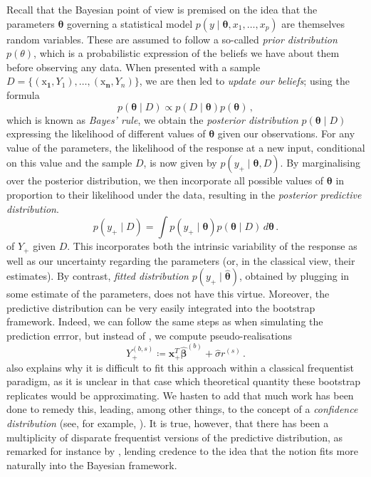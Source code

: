 \documentclass[a4paper]{book}
\begin{document}
Recall that the Bayesian point of view is premised on the idea that the parameters $\bm{\theta}$ governing a statistical model $p(y \mid \bm{\theta}, x_1, \dots, x_p)$ are themselves random variables. These are assumed to follow a so-called \emph{prior distribution} $p(\theta)$, which is a probabilistic expression of the beliefs we have about them before observing any data. When presented with a sample $D = \{ (\bm{\mathrm{x}_1}, Y_1), \dots, (\bm{\mathrm{x}_n}, Y_n) \}$, we are then led to \emph{update our beliefs}; using the formula
\begin{equation}
  p(\bm{\theta} \mid D) \propto p(D \mid \bm{\theta}) p(\bm{\theta}) \,,
\end{equation}
which is known as \emph{Bayes' rule}, we obtain the \emph{posterior distribution} $p(\bm{\theta} \mid D)$ expressing the likelihood of different values of $\bm{\theta}$ given our observations. For any value of the parameters, the likelihood of the response at a new input, conditional on this value and the sample $D$, is now given by $p(y_+ \mid \bm{\theta}, D)$. By marginalising over the posterior distribution, we then incorporate all possible values of $\bm{\theta}$ in proportion to their likelihood under the data, resulting in the \emph{posterior predictive distribution}.
\begin{equation}
  p(y_+ \mid D) = \int p(y_+ \mid \bm{\theta}) p(\bm{\theta} \mid D) \, d \bm{\theta} \,.
\end{equation}
of $Y_+$ given $D$. This incorporates both the intrinsic variability of the response as well as our uncertainty regarding the parameters (or, in the classical view, their estimates). By contrast, \emph{fitted distribution} $p(y_+ \mid \widehat{\bm{\theta}})$, obtained by plugging in some estimate of the parameters, does not have this virtue. Moreover, the predictive distribution can be very easily integrated into the bootstrap framework. Indeed, we can follow the same steps as when simulating the prediction errror, but instead of , we compute pseudo-realisations
\begin{equation} \label{eq:pred-dist}
  Y_+^{(b, s)} \coloneqq \mathbf{x}_+^T \widehat{\bm{\beta}}^{(b)} + \widehat{\sigma} r^{(s)} \,.
\end{equation}
 also explains why it is difficult to fit this approach within a classical frequentist paradigm, as it is unclear in that case which theoretical quantity these bootstrap replicates would be approximating. We hasten to add that much work has been done to remedy this, leading, among other things, to the concept of a \emph{confidence distribution} (see, for example, \cites{barndorff-nielsen,lawless}). It is true, however, that there has been a multiplicity of disparate frequentist versions of the predictive distribution, as remarked for instance by \textcite{dickson}, lending credence to the idea that the notion fits more naturally into the Bayesian framework.
\end{document}
